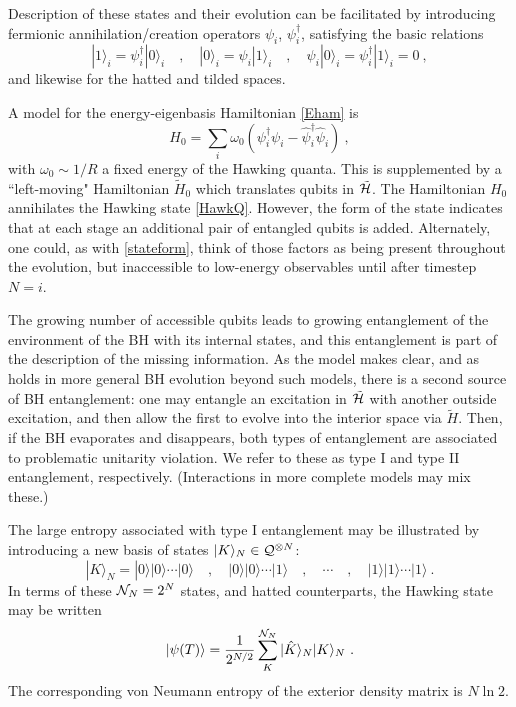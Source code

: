 \documentclass[12pt]{article}
\numberwithin{equation}{section}
\newcommand{\calh}{{\cal H}}
\newcommand{\caln}{{\cal N}}
\newcommand{\calq}{{\cal Q}}
\newcommand{\beq}{\begin{equation}}
\newcommand{\eeq}{\end{equation}}
\begin{document}
Description of these states  and their evolution can be facilitated by introducing fermionic annihilation/creation operators $\psi_i$, $\psi_i^\dagger$, satisfying the basic relations
\beq
|1\rangle_i = \psi_i^\dagger |0\rangle_i\quad ,\quad |0\rangle_i = \psi_i |1\rangle_i\quad,\quad \psi_i |0\rangle_i= \psi_i^\dagger |1\rangle_i =0\ ,
\eeq
and likewise for the hatted and tilded spaces.  

A model for the energy-eigenbasis Hamiltonian \eqref{Eham} is 
\beq\label{Hzero}
H_0=\sum_i \omega_0 \left(\psi_i^\dagger \psi_i - \hat \psi_i^\dagger \hat \psi_i\right)\ ,
\eeq
with $\omega_0\sim 1/R$ a fixed energy of the Hawking quanta.  This is supplemented by a ``left-moving" Hamiltonian $\tilde H_0$ which translates qubits in $\tilde \calh$.  The Hamiltonian $H_0$ annihilates the Hawking state \eqref{HawkQ}.  However, the form of the state indicates that at each stage an additional pair of entangled qubits is added.  Alternately, one could, as with \eqref{stateform}, think of those factors as being present throughout the evolution, but inaccessible to low-energy observables until after timestep $N=i$.  

The growing number of accessible qubits leads to growing entanglement of the environment of the BH with its internal states, and this entanglement is part of the description of the missing information.  As the model makes clear, and as holds in more general BH evolution beyond such models, there is a second source of BH entanglement: one may entangle an excitation in $\tilde \calh$ with another outside excitation, and then allow the first to evolve into the interior space via $\tilde H$.  Then, if the BH evaporates and disappears, both types of entanglement are associated to problematic unitarity violation.  We refer to these as type I and type II entanglement, respectively.  (Interactions in more complete models may mix these.)

The large entropy associated with type I entanglement may be illustrated by introducing a new basis of states $|K\rangle_N\in \calq^{\otimes N}$:
\beq
|K\rangle_N =  |0\rangle |0\rangle\cdots  |0\rangle\quad,\quad |0\rangle |0\rangle\cdots  |1\rangle\quad ,\quad\cdots\quad,  \quad |1\rangle |1\rangle\cdots   |1\rangle\ .
\eeq
In terms of these $\caln_N=2^N$ states, and hatted counterparts, the Hawking state may be written 
\beq\label{Hawkexp}
|\psi(T)\rangle = \frac{1}{2^{N/2}}  \sum_{K}^{\caln_N}|\hat K\rangle_N  |K\rangle_N \ .
\eeq
The corresponding von Neumann entropy of the exterior density matrix is $N\ln 2$.
\end{document}
